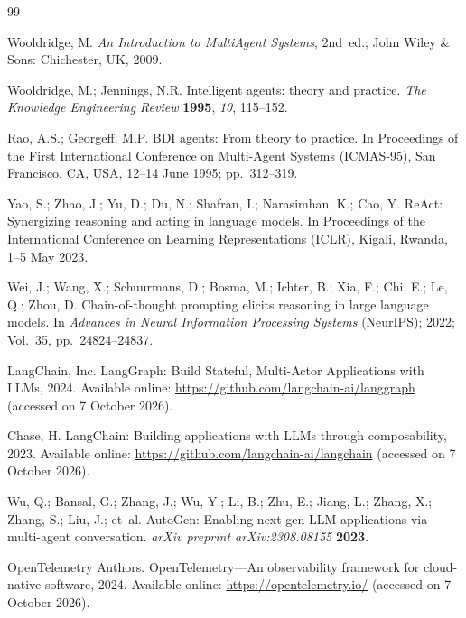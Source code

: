 \documentclass[make,article,submit,moreauthors,pdftex]{mdpi}
\begin{document}
\begin{thebibliography}{99}

Wooldridge, M.
\newblock \textit{An Introduction to MultiAgent Systems}, 2nd~ed.;
\newblock John Wiley \& Sons: Chichester, UK, 2009.

Wooldridge, M.; Jennings, N.R.
\newblock Intelligent agents: theory and practice.
\newblock \textit{The Knowledge Engineering Review} \textbf{1995}, \textit{10}, 115--152.

Rao, A.S.; Georgeff, M.P.
\newblock BDI agents: From theory to practice.
\newblock In Proceedings of the First International Conference on Multi-Agent Systems (ICMAS-95), San Francisco, CA, USA, 12--14 June 1995; pp.~312--319.

Yao, S.; Zhao, J.; Yu, D.; Du, N.; Shafran, I.; Narasimhan, K.; Cao, Y.
\newblock ReAct: Synergizing reasoning and acting in language models.
\newblock In Proceedings of the International Conference on Learning Representations (ICLR), Kigali, Rwanda, 1--5 May 2023.

Wei, J.; Wang, X.; Schuurmans, D.; Bosma, M.; Ichter, B.; Xia, F.; Chi, E.; Le, Q.; Zhou, D.
\newblock Chain-of-thought prompting elicits reasoning in large language models.
\newblock In \textit{Advances in Neural Information Processing Systems} (NeurIPS); 2022; Vol.~35, pp.~24824--24837.

LangChain, Inc.
\newblock LangGraph: Build Stateful, Multi-Actor Applications with LLMs, 2024.
\newblock Available online: \url{https://github.com/langchain-ai/langgraph} (accessed on 7 October 2026).

Chase, H.
\newblock LangChain: Building applications with LLMs through composability, 2023.
\newblock Available online: \url{https://github.com/langchain-ai/langchain} (accessed on 7 October 2026).

Wu, Q.; Bansal, G.; Zhang, J.; Wu, Y.; Li, B.; Zhu, E.; Jiang, L.; Zhang, X.; Zhang, S.; Liu, J.; et~al.
\newblock AutoGen: Enabling next-gen LLM applications via multi-agent conversation.
\newblock \textit{arXiv preprint arXiv:2308.08155} \textbf{2023}.

OpenTelemetry Authors.
\newblock OpenTelemetry---An observability framework for cloud-native software, 2024.
\newblock Available online: \url{https://opentelemetry.io/} (accessed on 7 October 2026).


\end{thebibliography}
\end{document}
